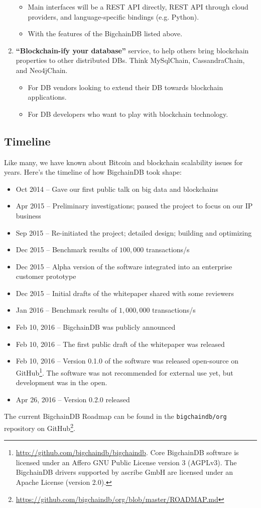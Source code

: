 \begin{enumerate}
\begin{itemize}
  \item Main interfaces will be a REST API directly, REST API through cloud providers, and language-specific bindings (e.g. Python).
  \item With the features of the BigchainDB listed above.
 \end{itemize}
 \item \textbf{“Blockchain-ify your database”} service, to help others bring blockchain properties to other distributed DBs. Think MySqlChain, CassandraChain, and Neo4jChain.
 \begin{itemize}
  \item For DB vendors looking to extend their DB towards blockchain applications.
  \item For DB developers who want to play with blockchain technology.
 \end{itemize}
\end{enumerate}


\subsection{Timeline}
Like many, we have known about Bitcoin and blockchain scalability issues for years.
Here’s the timeline of how BigchainDB took shape:
\begin{itemize}
  \item Oct 2014 – Gave our first public talk on big data and blockchains \cite{mcconaghy2014blockchain}
  \item Apr 2015 – Preliminary investigations; paused the project to focus on our IP business
  \item Sep 2015 – Re-initiated the project; detailed design; building and optimizing
  \item Dec 2015 – Benchmark results of $100,000$ transactions/s
  \item Dec 2015 – Alpha version of the software integrated into an enterprise customer prototype
  \item Dec 2015 – Initial drafts of the whitepaper shared with some reviewers
  \item Jan 2016 – Benchmark results of $1,000,000$ transactions/s
  \item Feb 10, 2016 – BigchainDB was publicly announced
  \item Feb 10, 2016 – The first public draft of the whitepaper was released
  \item Feb 10, 2016 – Version 0.1.0 of the software was released open-source on GitHub\footnote{\url{http://github.com/bigchaindb/bigchaindb}. Core BigchainDB software is licensed under an Affero GNU Public License version 3 (AGPLv3). The BigchainDB drivers supported by ascribe GmbH are licensed under an Apache License (version 2.0).}. The software was not recommended for external use yet, but development was in the open.
  \item Apr 26, 2016 – Version 0.2.0 released
\end{itemize}

The current BigchainDB Roadmap can be found in the \texttt{bigchaindb/org} repository on GitHub\footnote{\url{https://github.com/bigchaindb/org/blob/master/ROADMAP.md}}.